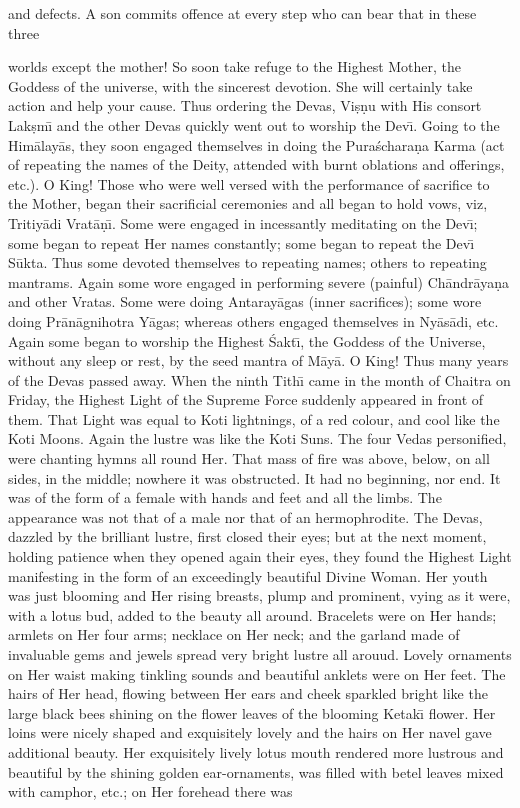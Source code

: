 and defects. A son commits offence at every step who can bear that in these three

worlds except the mother! So soon take refuge to the Highest Mother, the Goddess of the universe, with the sincerest devotion. She will certainly take action and help your cause. Thus ordering the Devas, Vi\d{s}\d{n}u with His consort Lak\d{s}m\={\i} and the other Devas quickly went out to worship the Dev\={\i}. Going to the Him\=alay\=as, they soon engaged themselves in doing the Pura\'schara\d{n}a Karma (act of repeating the names of the Deity, attended with burnt oblations and offerings, etc.). O King! Those who were well versed with the performance of sacrifice to the Mother, began their sacrificial ceremonies and all began to hold vows, viz, Tritiy\=adi Vrat\=a\d{n}\={\i}. Some were engaged in incessantly meditating on the Dev\={\i}; some began to repeat Her names constantly; some began to repeat the Dev\={\i} S\=ukta. Thus some devoted themselves to repeating names; others to repeating mantrams. Again some wore engaged in performing severe (painful) Ch\=andr\=aya\d{n}a and other Vratas. Some were doing Antaray\=agas (inner sacrifices); some wore doing Pr\=an\=agnihotra Y\=agas; whereas others engaged themselves in Ny\=as\=adi, etc. Again some began to worship the Highest \'Sakt\={\i}, the Goddess of the Universe, without any sleep or rest, by the seed mantra of M\=ay\=a. O King! Thus many years of the Devas passed away. When the ninth Tith\={\i} came in the month of Chaitra on Friday, the Highest Light of the Supreme Force suddenly appeared in front of them. That Light was equal to Koti lightnings, of a red colour, and cool like the Koti Moons. Again the lustre was like the Koti Suns. The four Vedas personified, were chanting hymns all round Her. That mass of fire was above, below, on all sides, in the middle; nowhere it was obstructed. It had no beginning, nor end. It was of the form of a female with hands and feet and all the limbs. The appearance was not that of a male nor that of an hermophrodite. The Devas, dazzled by the brilliant lustre, first closed their eyes; but at the next moment, holding patience when they opened again their eyes, they found the Highest Light manifesting in the form of an exceedingly beautiful Divine Woman. Her youth was just blooming and Her rising breasts, plump and prominent, vying as it were, with a lotus bud, added to the beauty all around. Bracelets were on Her hands; armlets on Her four arms; necklace on Her neck; and the garland made of invaluable gems and jewels spread very bright lustre all arouud. Lovely ornaments on Her waist making tinkling sounds and beautiful anklets were on Her feet. The hairs of Her head, flowing between Her ears and cheek sparkled bright like the large black bees shining on the flower leaves of the blooming Ketak\={\i} flower. Her loins were nicely shaped and exquisitely lovely and the hairs on Her navel gave additional beauty. Her exquisitely lively lotus mouth rendered more lustrous and beautiful by the shining golden ear-ornaments, was filled with betel leaves mixed with camphor, etc.; on Her forehead there was

